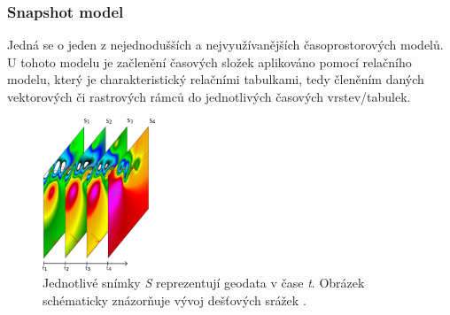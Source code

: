 \documentclass[a4paper,12pt,oneside]{report}
\begin{document}
\subsubsection*{Snapshot model}
Jedná se o jeden z  nejednodušších a nejvyužívanějších časoprostorových
modelů. U tohoto modelu je začlenění časových složek aplikováno pomocí
relačního modelu, který je charakteristický relačními tabulkami, tedy
členěním daných vektorových či rastrových rámců do jednotlivých
časových vrstev/tabulek.

\begin{figure}[h!]
    \centering
    \includegraphics[width=0.3\textwidth]{./img/temporal/snapshot.png}
    \caption[Snapshot model]{Jednotlivé snímky \emph{S} reprezentují  geodata v čase \emph{t}. Obrázek schématicky znázorňuje vývoj dešťových srážek  \centering \footnotemark. }
        \label{fig:snapshot}
 \end{figure}   
\end{document}
